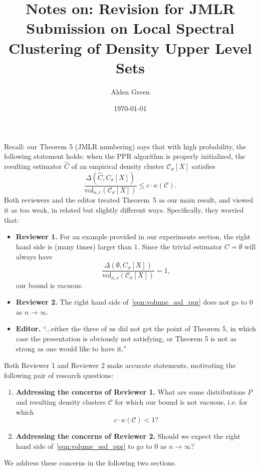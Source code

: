 \documentclass{article}
\newcommand{\vol}{\text{vol}}
\newcommand{\1}{\mathbf{1}}
\newcommand{\mc}[1]{\mathcal{#1}}
\newcommand{\wh}[1]{\widehat{#1}}
\theoremstyle{alden}
\theoremstyle{aldenthm}
\theoremstyle{definition}
\theoremstyle{remark}
\begin{document}
\title{Notes on: Revision for JMLR Submission on Local Spectral Clustering of Density Upper Level Sets}
\author{Alden Green}
\date{\today}
\maketitle

Recall: our Theorem 5 (JMLR numbering) says that with high probability, the following statement holds: when the PPR algorithm is properly initialized, the resulting estimator $\wh{C}$ of an empirical density cluster $\mc{C}_{\sigma}[X]$ satisfies
\begin{equation}
\label{eqn:volume_ssd_ppr}
\frac{\Delta(\wh{C},C_{\sigma}[X])}{\vol_{n,r}(\mc{C}_{\sigma}[X])} \leq c \cdot \kappa(\mc{C}).
\end{equation}
Both reviewers and the editor treated Theorem~5 as our main result, and viewed it as too weak, in related but slightly different ways. Specifically, they worried that:
\begin{itemize}
	\item \textbf{Reviewer 1.} For an example provided in our experiments section, the right hand side is (many times) larger than $1$. Since the trivial estimator $\wh{C} = \emptyset$ will always have
	\begin{equation*}
	\frac{\Delta(\emptyset,C_{\sigma}[X])}{\vol_{n,r}(\mc{C}_{\sigma}[X])}  = 1,
	\end{equation*}
	our bound is vacuous.
	\item \textbf{Reviewer 2.} The right hand side of~\eqref{eqn:volume_ssd_ppr} does not go to $0$ as $n \to \infty$. 
	\item \textbf{Editor.} ``...either the three of us did not get the 
	point of Theorem 5, in which case the presentation
	is obviously not satisfying, or Theorem 5 is not
	as strong as one would like to have it."
\end{itemize}

Both Reviewer 1 and Reviewer 2 make accurate statements, motivating the following pair of research questions:
\begin{enumerate}
	\item \textbf{Addressing the concerns of Reviewer 1.} What are some distributions $P$ and resulting density clusters $\mc{C}$ for which our bound is not vacuous, i.e. for which
	\begin{equation*}
	c \cdot \kappa(\mc{C}) < 1?
	\end{equation*}
	\item \textbf{Addressing the concerns of Reviewer 2.} Should we expect the right hand side of~\eqref{eqn:volume_ssd_ppr} to go to $0$ as $n \to \infty$?
\end{enumerate}
We address these concerns in the following two sections.
\end{document}
